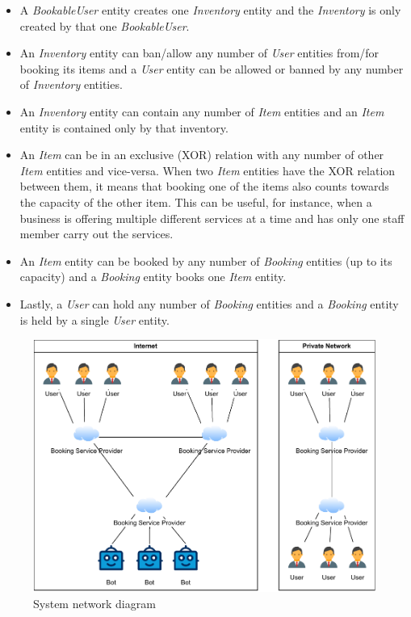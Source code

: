 \begin{itemize}
    \item A \textit{BookableUser} entity creates one \textit{Inventory} entity and the \textit{Inventory} is only created by that one \textit{BookableUser}.
    \item An \textit{Inventory} entity can ban/allow any number of \textit{User} entities from/for booking its items and a \textit{User} entity can be allowed or banned by any number of \textit{Inventory} entities.
    \item An \textit{Inventory} entity can contain any number of \textit{Item} entities and an \textit{Item} entity is contained only by that inventory.
    \item An \textit{Item} can be in an exclusive (XOR) relation with any number of other \textit{Item} entities and vice-versa. When two \textit{Item} entities have the XOR relation between them, it means that booking one of the items also counts towards the capacity of the other item. This can be useful, for instance, when a business is offering multiple different services at a time and has only one staff member carry out the services.
    \item An \textit{Item} entity can be booked by any number of \textit{Booking} entities (up to its capacity) and a \textit{Booking} entity books one \textit{Item} entity.
    \item Lastly, a \textit{User} can hold any number of \textit{Booking} entities and a \textit{Booking} entity is held by a single \textit{User} entity.
\end{itemize}

\begin{figure}
    \centering
    \includegraphics[width=1.0\textwidth]{content/design/system_network_diagram.drawio.pdf}
    \caption[System network diagram]{System network diagram}
    \label{fig:system_network_diagram}
\end{figure}

